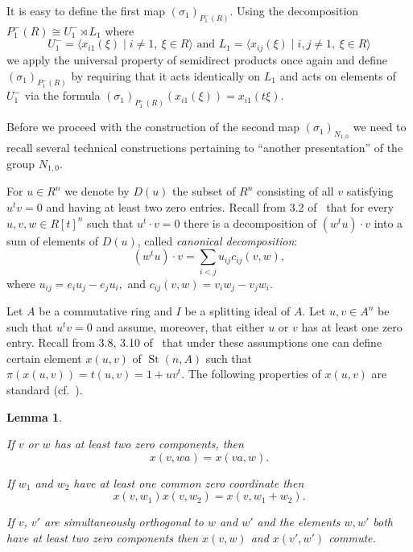 \documentclass[oneside, 10pt]{amsart}
\DeclareMathOperator{\St}{St}
\numberwithin{equation}{section}
\newtheorem{lemma}{Lemma}
\numberwithin{lemma}{section}
\theoremstyle{definition}
\theoremstyle{remark}
\begin{document}
It is easy to define the first map $(\sigma_1)_{P_1^-(R)}$.
Using the decomposition $P_1^-(R) \cong U^-_1 \rtimes L_1$ where 
\[U^-_1 = \langle x_{i1}(\xi) \mid i\neq 1,\ \xi\in R \rangle \text{ and } L_1 = \langle x_{ij}(\xi) \mid i,  j \neq 1,\ \xi\in R\rangle \]
we apply the universal property of semidirect products once again 
 and define $(\sigma_1)_{P_1^-(R)}$ by requiring that it acts identically on $L_1$ 
and acts on elements of $U^-_1$ via the formula $(\sigma_1)_{P_1^-(R)}(x_{i1}(\xi))= x_{i1}(t\xi)$.

Before we proceed with the construction of the second map $(\sigma_1)_{N_{1,0}}$ we need to recall several technical
 constructions pertaining to ``another presentation'' of the group $N_{1,0}$.

For $u \in R^n$ we denote by $D(u)$ the subset of $R^n$ consisting of all $v$ satisfying $u^tv = 0$ and having at least two zero entries.
Recall from 3.2 of~\cite{Ka77} that for every $u, v, w \in R[t]^n$ such that $u^t \cdot v = 0$ there
 is a decomposition of $(w^t u) \cdot v$ into a sum of elements of $D(u)$, called {\it canonical decomposition}:
\setcounter{equation}{1}
\renewcommand{\theequation}{\arabic{equation}}
\begin{equation} \label{eq:canonical} (w^tu) \cdot v=\sum_{i<j}u_{ij} c_{ij}(v, w),\end{equation}
where $u_{ij}=e_iu_j-e_ju_i,$ and $c_{ij}(v, w)=v_iw_j-v_jw_i.$

Let $A$ be a commutative ring and $I$ be a splitting ideal of $A$.
Let $u, v \in A^n$ be such that $u^t v = 0$ and assume, moreover, that either $u$ or $v$ has at least one zero entry.
Recall from 3.8, 3.10 of~\cite{Ka77} that under these assumptions one can define certain element
 $x(u, v)$ of $\St(n, A)$ such that $\pi(x(u, v)) = t(u, v) = 1 + uv^t$.
The following properties of $x(u, v)$ are standard (cf.~\cite[Lemma~1.1]{Tu83}).
\begin{lemma} \label{lem:xsmall-properties}
\begin{lemlist}
 \item \label{item:xsmall-scalar} If $v$ or $w$ has at least two zero components, then 
 \begin{equation}\nonumber x(v, wa) = x(va, w).\end{equation}
 \item \label{item:xsmall-additivity} If $w_1$ and $w_2$ have at least one common zero coordinate then
 \begin{equation}\nonumber x(v, w_1)x(v, w_2) = x(v, w_1+w_2).\end{equation}
 \item \label{item:xsmall-commute} If $v$, $v'$ are simultaneously orthogonal to $w$ and $w'$ and the elements $w, w'$
  both have at least two zero components then $x(v, w)$ and $x(v', w')$ commute.
\end{lemlist}
\end{lemma}
\end{document}
